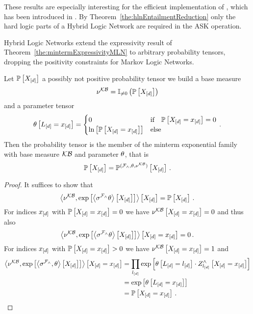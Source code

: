 These results are especially interesting for the efficient implementation of , which has been introduced in .
By Theorem~\ref{the:hlnEntailmentReduction} only the hard logic parts of a Hybrid Logic Network are required in the ASK operation.


Hybrid Logic Networks extend the expressivity result of Theorem~\ref{the:mintermExpressivityMLN} to arbitrary probability tensors, dropping the positivity constraints for Markov Logic Networks.

\begin{theorem}\label{the:mintermExpressivityHLN}
	Let $\mathbb{P}\left[X_{[d]}\right]$ a possibly not positive probability tensor we build a base measure
		\[ \nu^{\mathcal{KB}} = \mathbb{I}_{\neq0}\left(\mathbb{P}\left[X_{[d]}\right]\right) \]
	and a parameter tensor
	\begin{align*}
		\theta\left[L_{[d]}=x_{[d]}\right]
		= \begin{cases}
			0 & \text{if} \quad \mathbb{P}\left[X_{[d]}=x_{[d]}\right] = 0  \\
			\ln \left[ \mathbb{P}\left[X_{[d]}=x_{[d]}\right] \right] & \text{else} 
		\end{cases} \, . 
	\end{align*}
	Then the probability tensor is the member of the minterm exponential family with base measure $\mathcal{KB}$ and parameter $\theta$, that is
		\[ \mathbb{P}\left[X_{[d]}\right] = \mathbb{P}^{(\mathcal{F}_{\land},\theta,\nu^{\mathcal{KB}})}\left[X_{[d]}\right] \, . \]
\end{theorem}
\begin{proof}
	It suffices to show that 
		\[ \left\langle \nu^{\mathcal{KB}}, \mathrm{exp}\left[\left\langle 
		\sigma^{\mathcal{F}_{\land}}\theta
		\right\rangle \left[ 
		X_{[d]}
		 \right]\right]\right\rangle \left[ X_{[d]} \right] = \mathbb{P}\left[X_{[d]}\right] \, . \]
	For indices $x_{[d]}$ with $\mathbb{P}\left[X_{[d]}=x_{[d]}\right]=0$ we have $\nu^{\mathcal{KB}}\left[X_{[d]}=x_{[d]}\right]=0$ and thus also 
		\[ \left\langle \nu^{\mathcal{KB}}, \mathrm{exp}\left[\left\langle 
		\sigma^{\mathcal{F}_{\land}}\theta
		\right\rangle \left[ 
		X_{[d]}
		 \right]\right]\right\rangle \left[ X_{[d]}=x_{[d]} \right] = 0 \, . \]
	For indices $x_{[d]}$ with $\mathbb{P}\left[X_{[d]}=x_{[d]}\right]>0$ we have $\nu^{\mathcal{KB}}\left[X_{[d]}=x_{[d]}\right]=1$ and
	\begin{align*}
		 \left\langle \nu^{\mathcal{KB}}, \mathrm{exp}\left[\left\langle 
		\sigma^{\mathcal{F}_{\land}},\theta
		\right\rangle \left[ 
		X_{[d]}
		 \right]\right]\right\rangle \left[ X_{[d]}=x_{[d]} \right] 
		&= \prod_{l_{[d]}} \mathrm{exp}\left[\theta\left[L_{[d]}=l_{[d]}\right] \cdot Z^{\land}_{l_{[d]}}\left[X_{[d]}=x_{[d]}\right]\right] \\
		&=  \mathrm{exp}\left[\theta\left[L_{[d]}=x_{[d]}\right]\right] \\
		&=  \mathbb{P}\left[X_{[d]}=x_{[d]}\right] \, .
	\end{align*}
\end{proof}



